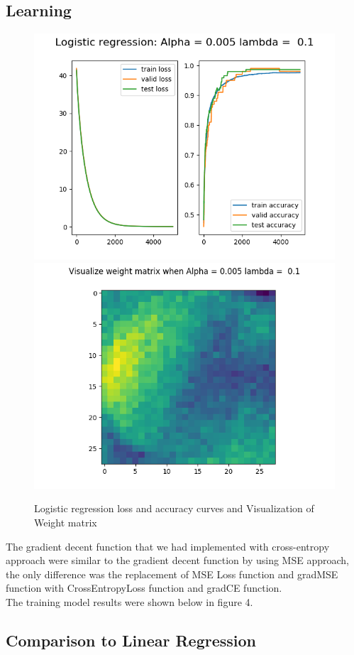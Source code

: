 \documentclass[10pt,letterpaper]{article}
\begin{document}
\subsection{Learning}

\begin{figure}[H]
\centering
 \begin{subfig}
  \includegraphics[width=.5\linewidth]{Reg_Logi_regression_01.png}\hfill
  \includegraphics[width=.5\linewidth]{reg_Logi_VWM_01.png}\hfill
  \caption{Logistic regression loss and accuracy curves and Visualization of Weight matrix}
  \end{subfig}
\end{figure}

\qquad The gradient decent function that we had implemented with cross-entropy approach were similar to the gradient decent function by using MSE approach, the only difference was the replacement of MSE Loss function and gradMSE function with CrossEntropyLoss function and gradCE function. \\

The training model results were shown below in figure 4.\\





\subsection{Comparison to Linear Regression}
\end{document}
